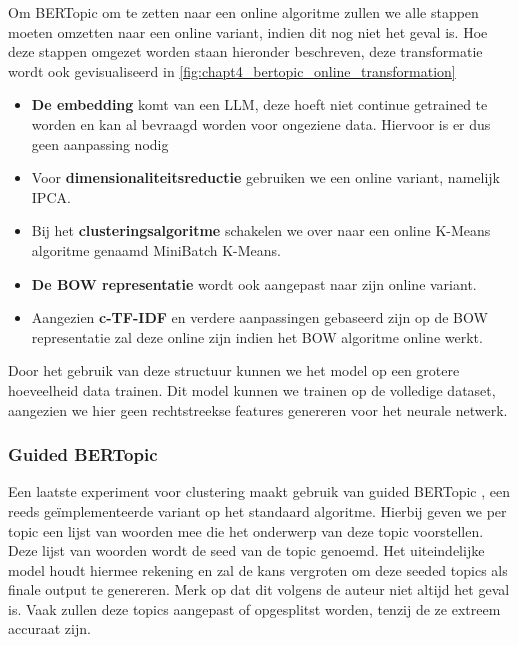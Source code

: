 Om BERTopic om te zetten naar een online algoritme zullen we alle stappen moeten omzetten naar een online variant, indien dit nog niet het geval is. Hoe deze stappen omgezet worden staan hieronder beschreven, deze transformatie wordt ook gevisualiseerd in \autoref{fig:chapt4_bertopic_online_transformation}

\begin{itemize}
    \item \textbf{De embedding} komt van een LLM, deze hoeft niet continue getrained te worden en kan al bevraagd worden voor ongeziene data. Hiervoor is er dus geen aanpassing nodig
    \item Voor \textbf{dimensionaliteitsreductie} gebruiken we een online variant, namelijk IPCA.
    \item Bij het \textbf{clusteringsalgoritme} schakelen we over naar een online K-Means algoritme genaamd MiniBatch K-Means.
    \item \textbf{De BOW representatie} wordt ook aangepast naar zijn online variant.
    \item Aangezien \textbf{c-TF-IDF} en verdere aanpassingen gebaseerd zijn op de BOW representatie zal deze online zijn indien het BOW algoritme online werkt.
\end{itemize}


Door het gebruik van deze structuur kunnen we het model op een grotere hoeveelheid data trainen. Dit model kunnen we trainen op de volledige dataset, aangezien we hier  geen rechtstreekse features genereren voor het neurale netwerk.

%

\subsubsection{Guided BERTopic}
Een laatste experiment voor clustering maakt gebruik van guided BERTopic \cite{bertopic_guided}, een reeds geïmplementeerde variant op het standaard algoritme. Hierbij geven we per topic een lijst van woorden mee die het onderwerp van deze topic voorstellen. Deze lijst van woorden wordt de seed van de topic genoemd. Het uiteindelijke model houdt hiermee rekening en zal de kans vergroten om deze seeded topics als finale output te genereren. Merk op dat dit volgens de auteur niet altijd het geval is. Vaak zullen deze topics aangepast of opgesplitst worden, tenzij de ze extreem accuraat zijn.

